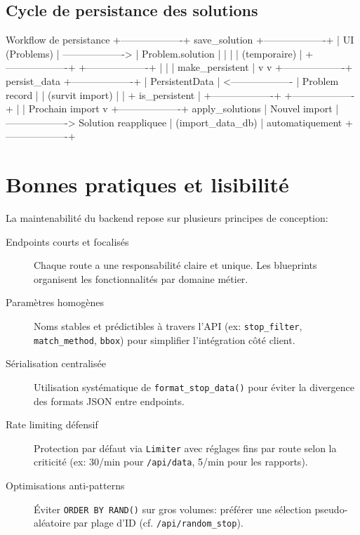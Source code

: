 \subsection*{Cycle de persistance des solutions}

\begin{codebox}{Workflow de persistance}
+-------------------+    save_solution     +-------------------+
| UI (Problems)     | -------------------> | Problem.solution  |
|                   |                      | (temporaire)      |
+-------------------+                      +-------------------+
        |                                           |
        | make_persistent                           |
        v                                           v
+-------------------+    persist_data      +-------------------+
| PersistentData    | <------------------- | Problem record    |
| (survit import)   |                      | + is_persistent   |
+-------------------+                      +-------------------+
        |                                         
        | Prochain import                         
        v                                         
+-------------------+    apply_solutions   
| Nouvel import     | -------------------> Solution reappliquee
| (import_data_db)  |                      automatiquement
+-------------------+                      
\end{codebox}

\section{Bonnes pratiques et lisibilité}

La maintenabilité du backend repose sur plusieurs principes de conception:

\begin{description}
  \item[Endpoints courts et focalisés] Chaque route a une responsabilité claire et unique. Les blueprints organisent les fonctionnalités par domaine métier.
  
  \item[Paramètres homogènes] Noms stables et prédictibles à travers l'API (ex: \texttt{stop\_filter}, \texttt{match\_method}, \texttt{bbox}) pour simplifier l'intégration côté client.
  
  \item[Sérialisation centralisée] Utilisation systématique de \texttt{format\_stop\_data()} pour éviter la divergence des formats JSON entre endpoints.
  
  \item[Rate limiting défensif] Protection par défaut via \texttt{Limiter} avec réglages fins par route selon la criticité (ex: 30/min pour \texttt{/api/data}, 5/min pour les rapports).
  
  \item[Optimisations anti-patterns] Éviter \texttt{ORDER BY RAND()} sur gros volumes: préférer une sélection pseudo-aléatoire par plage d'ID (cf. \texttt{/api/random\_stop}).
\end{description}

